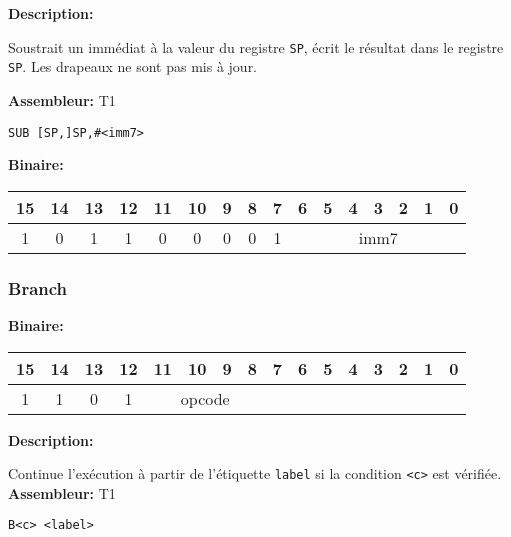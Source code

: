 
\textbf{Description: }

Soustrait un immédiat à la valeur du registre \texttt{SP}, écrit le résultat dans le registre \texttt{SP}.
Les drapeaux ne sont pas mis à jour.

\textbf{Assembleur:} T1

\begin{lstlisting}
SUB [SP,]SP,#<imm7>
\end{lstlisting}



\textbf{Binaire:}\\

\begin{tabular}{| c c c c c c c c c c c c c c c c |}
\hline
15 & 14 & 13 & 12 & \multicolumn{1}{|c}{11} & 10 & 9 & 8 & \multicolumn{1}{|c}{7} & \multicolumn{1}{|c}{6} & 5 & 4 & 3 & 2 & 1 & 0 \\
\hline
1 & 0 & 1 & 1 & \multicolumn{1}{|c}{0} & 0 & 0 & 0 & \multicolumn{1}{|c}{1} & \multicolumn{7}{|c|}{imm7} \\
\hline
\end{tabular}



\subsubsection{Branch}

\textbf{Binaire:}\\

\begin{tabular}{| c c c c c c c c c c c c c c c c |}
\hline
15 & 14 & 13 & 12 & \multicolumn{1}{|c}{11} & 10 & 9 & 8 & \multicolumn{1}{|c}{7} & 6 & 5 & 4 & 3 & 2 & 1 & 0 \\
\hline
1 & 1 & 0 & 1 & \multicolumn{4}{|c}{opcode} & \multicolumn{8}{|c|}{} \\
\hline
\end{tabular}


\textbf{Description: }

Continue l'exécution à partir de l'étiquette \texttt{label} si la condition \texttt{<c>} est vérifiée.\\

\textbf{Assembleur:} T1

\begin{lstlisting}
B<c> <label>
\end{lstlisting}

